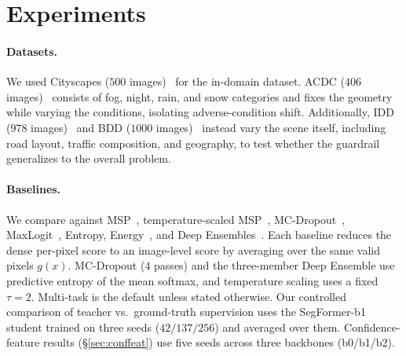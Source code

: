 \documentclass{article}
\begin{document}
\section{Experiments}

\paragraph{Datasets.}
We used Cityscapes ($500$ images)~\cite{cordts2016cityscapes} for the in-domain dataset. ACDC ($406$ images)~\cite{sakaridis2021acdc} consists of fog, night, rain, and snow categories and fixes the geometry while varying the conditions, isolating adverse-condition shift. Additionally, IDD ($978$ images)~\cite{varma2019idd} and BDD ($1000$ images)~\cite{yu2020bdd100k} instead vary the scene itself, including road layout, traffic composition, and geography, to test whether the guardrail generalizes to the overall problem.

\paragraph{Baselines.}
We compare against MSP~\cite{hendrycks2017baseline}, temperature-scaled MSP~\cite{guo2017calibration}, MC-Dropout~\cite{gal2016dropout}, MaxLogit~\cite{hendrycks2022scaling}, Entropy, Energy~\cite{liu2020energy}, and Deep Ensembles~\cite{lakshminarayanan2017deepensembles}. Each baseline reduces the dense per-pixel score to an image-level score by averaging over the same valid pixels $g(x)$. MC-Dropout ($4$ passes) and the three-member Deep Ensemble use predictive entropy of the mean softmax, and temperature scaling uses a fixed $\tau{=}2$. Multi-task is the default unless stated otherwise. Our controlled comparison of teacher vs.\ ground-truth supervision uses the SegFormer-b1 student trained on three seeds ($42/137/256$) and averaged over them. Confidence-feature results (\S\ref{sec:conffeat}) use five seeds across three backbones (b0/b1/b2).
\end{document}
